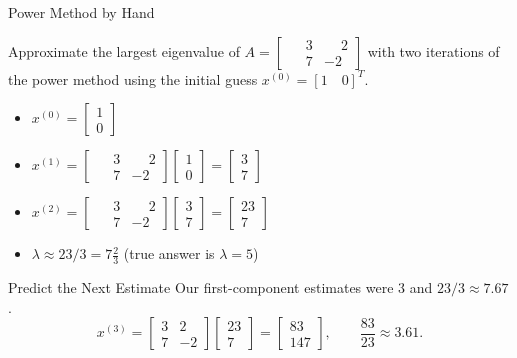 \documentclass[10pt]{beamer}
\begin{document}

\begin{frame}{Power Method by Hand}
\begin{example}
    Approximate the largest eigenvalue of $A = \begin{bmatrix} \phantom{-}3 & \phantom{-}2 \\ \phantom{-}7&-2 \end{bmatrix}$ with two iterations of the power method using the initial guess $x^{(0)} = [1 \quad 0]^T$. 
\end{example}
\begin{itemize}
    \item $x^{(0)} = \begin{bmatrix} 1\\0\end{bmatrix}$
    \item $x^{(1)} = \begin{bmatrix} \phantom{-}3 & \phantom{-}2 \\ \phantom{-}7&-2 \end{bmatrix}\begin{bmatrix} 1\\0 \end{bmatrix} = \begin{bmatrix} 3\\7 \end{bmatrix}$
    \item $x^{(2)} = \begin{bmatrix} \phantom{-}3 & \phantom{-}2 \\ \phantom{-}7&-2 \end{bmatrix}\begin{bmatrix} 3\\7 \end{bmatrix} = \begin{bmatrix} 23\\7 \end{bmatrix}$
    \item $\lambda \approx 23/3 = 7\frac{2}{3}$ (true answer is $\lambda=5$) 
\end{itemize}
    
\end{frame}


\begin{frame}{Predict the Next Estimate}
Our first-component estimates were $3$ and $23/3\approx7.67$.
\pause
\[
x^{(3)}=\begin{bmatrix}3&2\\7&-2\end{bmatrix}
\begin{bmatrix}23\\7\end{bmatrix}=\begin{bmatrix}83\\147\end{bmatrix},
\qquad \frac{83}{23}\approx3.61.
\]
\end{frame}
\end{document}
